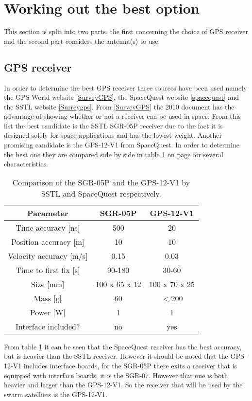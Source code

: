 \documentclass[11pt]{report}
\begin{document}
\section{Working out the best option}
\label{navi3}
This section is split into two parts, the first concerning the choice of \acs{GPS} receiver and the second part considers the antenna(s) to use.

\subsection{GPS receiver}
In order to determine the best \acs{GPS} receiver three sources have been used namely the GPS World website \ref{SurveyGPS}, the SpaceQuest website \ref{spacequest} and the \ac{SSTL} website \ref{Surreygps}. From \ref{SurveyGPS} the 2010 document has the advantage of showing whether or not a receiver can be used in space. From this list the best candidate is the \acs{SSTL} SGR-05P receiver due to the fact it is designed solely for space applications and has the lowest weight. Another promising candidate is the GPS-12-V1 from SpaceQuest. In order to determine the best one they are compared side by side in table \ref{comparegps} on page \pageref{comparegps} for several characteristics.

\begin{table}
\centering
\begin{tabular}{c||c|c}
\textbf{Parameter} & \textbf{SGR-05P} & \textbf{GPS-12-V1} \\\hline\hline
	Time accuracy [ns] & 500 & 20 \\
	Position accuracy [m] & 10 & 10 \\
	Velocity accuracy [m/s] & 0.15 & 0.03 \\
	Time to first fix [s] & 90-180 & 30-60 \\
	Size [mm] & 100 x 65 x 12 & 100 x 70 x 25\\
	Mass [g] & 60 & $<$200 \\
	Power [W] & 1 & 1 \\
	Interface included? & no & yes \\
\end{tabular}
\caption{Comparison of the SGR-05P and the GPS-12-V1 by \acs{SSTL} and SpaceQuest respectively.}
\label{comparegps}
\end{table}

From table \ref{comparegps} it can be seen that the SpaceQuest receiver has the best accuracy, but is heavier than the \acs{SSTL} receiver. However it should be noted that the GPS-12-V1 includes interface boards, for the SGR-05P there exits a receiver that is equipped with interface boards, it is the SGR-07. However that one is both heavier and larger than the GPS-12-V1. So the receiver that will be used by the swarm satellites is the GPS-12-V1.
\end{document}
